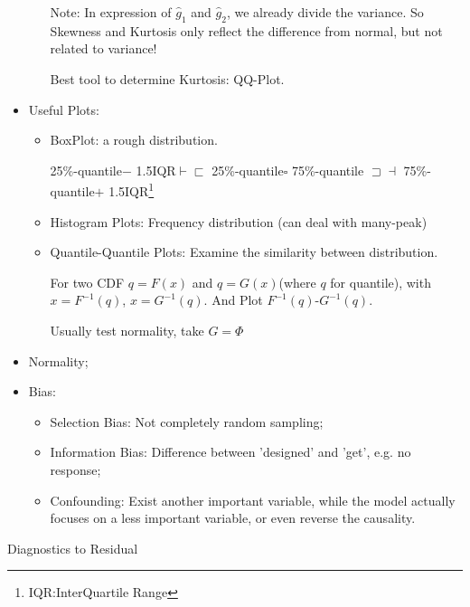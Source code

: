 \begin{itemize}[topsep=2pt,itemsep=2pt]
\begin{itemize}[topsep=2pt,itemsep=2pt]
            Note: In expression of $ \hat{g}_1 $ and $ \hat{g}_2 $, we already divide the variance. So Skewness and Kurtosis only reflect the difference from normal, but not related to variance!
                
            Best tool to determine Kurtosis: QQ-Plot.
            
        \end{itemize}
        \item Useful Plots:
        \begin{itemize}[topsep=2pt,itemsep=2pt]
            \item BoxPlot: a rough distribution.
            
            25\%-quantile$ - $ 1.5IQR$ \vdash \sqsubset  $ 25\%-quantile$ \square  $ 75\%-quantile $ \sqsupset \dashv  $ 75\%-quantile$ + $ 1.5IQR\footnote{IQR:InterQuartile Range}

            \item Histogram Plots: Frequency distribution (can deal with many-peak)
            \item Quantile-Quantile Plots: Examine the similarity  between distribution.
            
            For two CDF $ q=F(x) $ and $ q=G(x) $(where $ q $ for quantile), with $ x=F^{-1}(q) $, $ x=G^{-1}(q) $. And Plot $ F^{-1}(q) $-$ G^{-1}(q) $.

            Usually test normality, take $ G=\Phi  $
        \end{itemize}
        
            
        \item Normality;
        \item Bias:
        \begin{itemize}[topsep=2pt,itemsep=2pt]
            \item Selection Bias: Not completely random sampling;
            \item Information Bias: Difference between 'designed' and 'get', e.g. no response;
            \item Confounding: Exist another important variable, while the model actually focuses on a less important variable, or even reverse the causality.
        \end{itemize}
        
            
    \end{itemize}
    
\begin{point}
    Diagnostics to Residual
\end{point}

